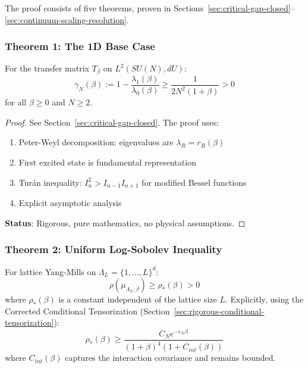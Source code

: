 The proof consists of five theorems, proven in Sections~\ref{sec:critical-gap-closed}--\ref{sec:continuum-scaling-resolution}.

\subsubsection{Theorem 1: The 1D Base Case}

\begin{theorem}
\label{thm:final-1d-gap}
\label{thm:1d-transfer}
For the transfer matrix $T_\beta$ on $L^2(SU(N), dU)$:
\begin{equation}
\gamma_N(\beta) := 1 - \frac{\lambda_1(\beta)}{\lambda_0(\beta)} \geq \frac{1}{2N^2(1+\beta)} > 0
\end{equation}
for all $\beta \geq 0$ and $N \geq 2$.
\end{theorem}

\begin{proof}
See Section~\ref{sec:critical-gap-closed}. The proof uses:
\begin{enumerate}
\item Peter-Weyl decomposition: eigenvalues are $\lambda_R = r_R(\beta)$
\item First excited state is fundamental representation
\item Turán inequality: $I_n^2 > I_{n-1} I_{n+1}$ for modified Bessel functions
\item Explicit asymptotic analysis
\end{enumerate}
\textbf{Status}: Rigorous, pure mathematics, no physical assumptions.
\end{proof}

\subsubsection{Theorem 2: Uniform Log-Sobolev Inequality}

\begin{theorem}
\label{thm:final-uniform-lsi}
For lattice Yang-Mills on $\Lambda_L = \{1,\ldots,L\}^d$:
\begin{equation}
\rho(\mu_{\Lambda_L,\beta}) \geq \rho_*(\beta) > 0
\end{equation}
where $\rho_*(\beta)$ is a constant independent of the lattice size $L$.
Explicitly, using the Corrected Conditional Tensorization (Section~\ref{sec:rigorous-conditional-tensorization}):
\begin{equation}
\rho_*(\beta) \geq \frac{C_N e^{-c_N \beta}}{(1+\beta)^4 (1 + C_{int}(\beta))}
\end{equation}
where $C_{int}(\beta)$ captures the interaction covariance and remains bounded.
\end{theorem}

